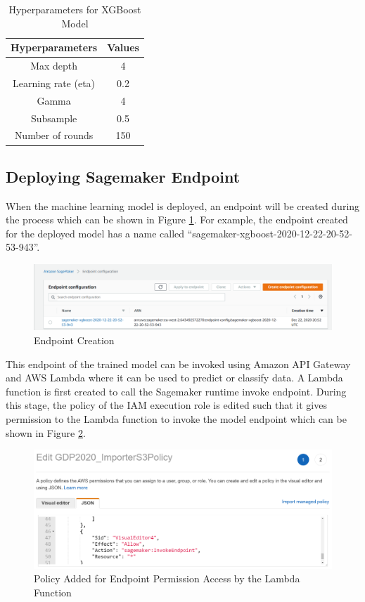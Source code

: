 \begin{table}[ht]
\centering
\begin{center}
\begin{tabular}{ |c|c| } 
  \hline
Hyperparameters  & Values\\ 
  \hline\hline
Max depth & 4\\ 
Learning rate (eta) & 0.2\\ 
Gamma & 4\\ 
Subsample & 0.5\\ 
Number of rounds & 150\\ 


 \hline
\end{tabular}
\caption{Hyperparameters for XGBoost Model}
\label{table:xg}
\end{center}
\end{table}

\subsection{Deploying Sagemaker Endpoint} 
When the machine learning model is deployed, an endpoint will be created during the process which can be shown in Figure \ref{fig_endpoint}. For example, the endpoint created for the deployed model has a name called ``sagemaker-xgboost-2020-12-22-20-52-53-943''. 

\begin{figure} [ht]
    \centering
    \includegraphics[scale= 0.44]{pages/Chapter4/Chapter 4 Images/Endpoint.PNG}
    \caption{Endpoint Creation}
    \label{fig_endpoint}
\end{figure}

This endpoint of the trained model can be invoked using Amazon API Gateway and AWS Lambda where it can be used to predict or classify data. A Lambda function is first created to call the Sagemaker runtime invoke endpoint. During this stage, the policy of the IAM execution role is edited such that it gives permission to the Lambda function to invoke the model endpoint which can be shown in Figure \ref{fig_policy}. 

\begin{figure} [ht]
    \centering
    \includegraphics[scale =0.43]{pages/Chapter4/Chapter 4 Images/Policy.PNG}
    \caption{Policy Added for Endpoint Permission Access by the Lambda Function}
    \label{fig_policy}
\end{figure}

